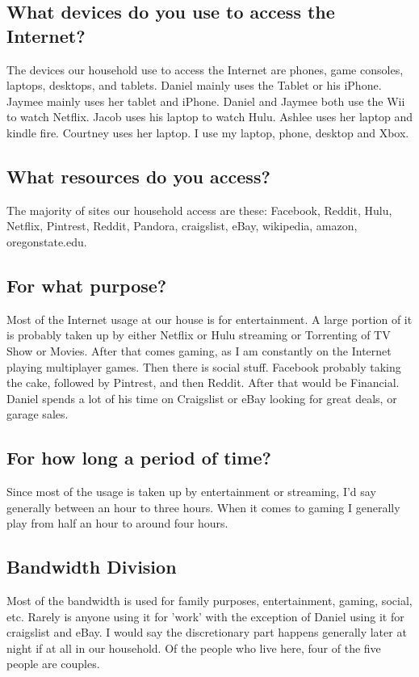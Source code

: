 \documentclass[12pt,letterpaper]{article}
\begin{document}
\subsection{What devices do you use to access the Internet?}
The devices our household use to access the Internet are phones, game
consoles, laptops, desktops, and tablets. Daniel mainly uses the Tablet
or his iPhone. Jaymee mainly uses her tablet and iPhone. Daniel and
Jaymee both use the Wii to watch Netflix. Jacob uses his
laptop to watch Hulu. Ashlee uses her laptop and kindle fire. Courtney uses her
laptop. I use my laptop, phone, desktop and Xbox.

\subsection{What resources do you access?}
The majority of sites our household access are these:
Facebook, Reddit, Hulu, Netflix, Pintrest, Reddit, Pandora, craigslist,
eBay, wikipedia, amazon, oregonstate.edu.

\subsection{For what purpose?}
Most of the Internet usage at our house is for entertainment. A large
portion of it is probably taken up by either Netflix or Hulu streaming or
Torrenting of TV Show or Movies. After that comes gaming, as I am
constantly on the Internet playing multiplayer games. Then there is
social stuff. Facebook probably taking the cake, followed by Pintrest,
and then Reddit. After that would be Financial. Daniel spends a lot of
his time on Craigslist or eBay looking for great deals, or garage sales.

\subsection{For how long a period of time?}
Since most of the usage is taken up by entertainment or streaming, I'd
say generally between an hour to three hours. When it comes to gaming I
generally play from half an hour to around four hours.

\subsection{Bandwidth Division}
Most of the bandwidth is used for family purposes, entertainment,
gaming, social, etc. Rarely is anyone using it for 'work' with the
exception of Daniel using it for craigslist and eBay. I would say the
discretionary part happens generally later at night if at all in our
household. Of the people who live here, four of the five people are
couples.
\end{document}
